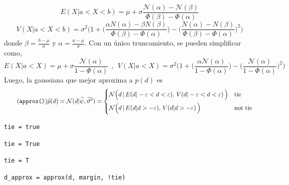 \documentclass[a4paper,11pt]{book}
\newcommand{\N}{\mathcal{N}}
\theoremstyle{definition}
\begin{document}
%
\begin{equation}\label{eq:mean_aprox_double}
 E(X| a < X < b) = \mu + \sigma \frac{\N(\alpha) - \N(\beta) }{\Phi(\beta) - \Phi(\alpha) }
\end{equation}
%
\begin{equation}\label{eq:variance_aprox_double}
 V(X| a < X < b) = \sigma^2 \Bigg( 1 + \bigg(\frac{\alpha N(\alpha) - \beta N(\beta) }{\Phi(\beta) - \Phi(\alpha) }\bigg) - \bigg(\frac{N(\alpha) - N(\beta) }{\Phi(\beta) - \Phi(\alpha) }\bigg)^2 \Bigg)
\end{equation}
%
donde $\beta = \frac{b-\mu}{\sigma}$ y $\alpha = \frac{a-\mu}{\sigma}$.
%
Con un único truncamiento, se pueden simplificar como,
%
\begin{equation*}
 E(X| a < X )   =  \mu + \sigma \frac{\N(\alpha)}{1 - \Phi(\alpha) } \ \ , \ \ V(X| a < X )  = \sigma^2 \Bigg( 1 + \bigg(\frac{\alpha \N(\alpha)}{1 - \Phi(\alpha) }\bigg) - \bigg(\frac{\N(\alpha)}{1 - \Phi(\alpha) }\bigg)^2 \Bigg)
\end{equation*}
%
Luego, la gaussiana que mejor aproxima a $p(d)$ es
%
\begin{equation}\label{eq:p*_d} \tag{\texttt{approx()}}
 \widehat{p}(d) = \N(d | \widehat{\psi}, \widehat{\vartheta}^2) =
 \begin{cases*}
 \N\Big(d \,  | \, E(d | -\varepsilon < d < \varepsilon ) , \,  V(d | -\varepsilon < d < \varepsilon ) \, \Big) & \text{tie} \\
\N\Big(d \,  | \, E(d | d > -\varepsilon ) , \,  V(d | d > -\varepsilon ) \, \Big) & \text{not tie}
  \end{cases*}
\end{equation}
%
\begin{paracol}{3}
\begin{lstlisting}[backgroundcolor=\color{julia!60},belowskip=0cm]
tie = true
\end{lstlisting}
\switchcolumn
\begin{lstlisting}[backgroundcolor=\color{python!60},belowskip=0cm]
tie = True
\end{lstlisting}
\switchcolumn
\begin{lstlisting}[backgroundcolor=\color{r!50},belowskip=0cm]
tie = T
\end{lstlisting}
\end{paracol}
\begin{lstlisting}[captionpos=b,backgroundcolor=\color{all},label=lst:d_approx, caption={Computando la aproximación de la diferencia de desempeños},belowskip=0cm,aboveskip=0cm]
d_approx = approx(d, margin, !tie)
\end{lstlisting}
\end{document}
